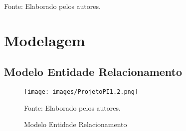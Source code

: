 \documentclass[
    12pt,               %
    openright,          %
    oneside,
    a4paper,            %
    BIBLATEX,           %
    TODO,               %
    english,            %
    brazil              %
    ]{ifsp-spo-inf-ctds}
\begin{document}
\begin{center}
\begin{quadro}[H]
        \label{tab:hist_usuario}
        \centering
        {\footnotesize Fonte: Elaborado pelos autores.}
        \end{quadro}
    \end{center}  

    \section{Modelagem}
    
        \subsection{Modelo Entidade Relacionamento}
        
            \begin{figure}[H]
            \centering
                \caption{Modelo Entidade Relacionamento}
                \texttt{[image: images/ProjetoPI1.2.png]}
                
                \label{fig:MER2}
                \centering
                {\footnotesize Fonte: Elaborado pelos autores.}
            \end{figure}
\end{document}
